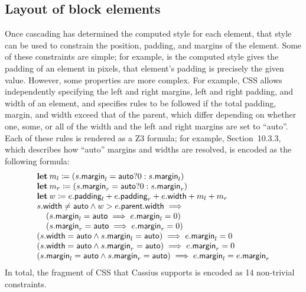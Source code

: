 \documentclass[10pt]{sigplanconf}
\newcommand{\name}{Cassius\xspace}
\newenvironment{pseudocode}
{ \footnotesize \[ \begin{array}{l} }
{ \end{array} \] }
\newcommand{\T}[1]{\text{\textsf{#1}}}
\newcommand{\K}[1]{\ensuremath{\mathbf{#1}}\relax\ifmmode\:\else\fi}
\def\>{\;\;\;\;}
\newcommand{\ceq}{\ensuremath{\coloneqq}}
\begin{document}
\subsection{Layout of block elements}
Once cascading has determined the computed style for each element,
  that style can be used to constrain
  the position, padding, and margins of the element.
Some of these constraints are simple;
  for example, is the computed style
  gives the padding of an element in pixels,
  that element's padding is precisely the given value.
However, some properties are more complex.
For example, CSS allows independently specifying
  the left and right margins, left and right padding,
  and width of an element,
  and specifies rules to be followed
  if the total padding, margin, and width exceed that of the parent,
  which differ depending on whether one, some, or all
  of the width and the left and right margins are set to ``auto''.
Each of these rules is rendered as a Z3 formula;
  for example, Section~10.3.3,
  which describes how ``auto'' margins and widths are resolved,
  is encoded as the following formula:
\begin{pseudocode}
\K{let} m_l \ceq (s.\T{margin}_l = \T{auto} ? 0 : s.\T{margin}_l) \\
\K{let} m_r \ceq (s.\T{margin}_r = \T{auto} ? 0 : s.\T{margin}_r) \\
\K{let} w \ceq e.\T{padding}_l + e.\T{padding}_r + e.\T{width} + m_l + m_r \\

s.\T{width} \ne \T{auto} \land w  > e.\T{parent}.\T{width} \implies \\
\> (s.\T{margin}_l = \T{auto} \implies e.\T{margin}_l = 0) \\
\> (s.\T{margin}_r = \T{auto} \implies e.\T{margin}_r = 0) \\
(s.\T{width} = \T{auto} \land s.\T{margin}_l = \T{auto})
\implies e.\T{margin}_l = 0 \\
(s.\T{width} = \T{auto} \land s.\T{margin}_r = \T{auto})
\implies e.\T{margin}_r = 0 \\
(s.\T{margin}_l = \T{auto} \land s.\T{margin}_r = \T{auto})
\implies e.\T{margin}_l = e.\T{margin}_r
\end{pseudocode}
In total, the fragment of CSS that \name supports
  is encoded as 14 non-trivial constraints.
\end{document}
